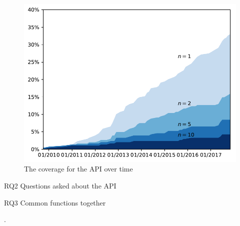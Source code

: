 \begin{figure}
  \includegraphics{scripts/figures/1-3-coverage-by-time}
  \caption{The coverage for the API over time}
  \label{usageref}
\end{figure}


RQ2
Questions asked about the API

RQ3
Common functions together












.
